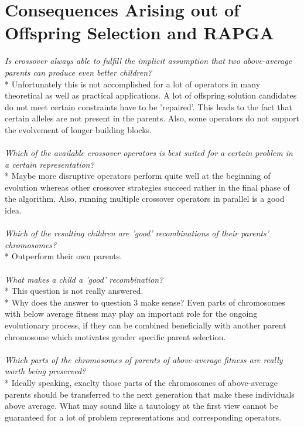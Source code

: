 \documentclass[12pt]{book}
\begin{document}
\section{Consequences Arising out of Offspring Selection and RAPGA}
\textit{Is crossover always able to fulfill the implicit assumption that two above-average parents can produce even better children?}\\*
Unfortunately this is not accomplished for a lot of operators in many theoretical as well as practical applications. A lot of offspring solution candidates do not meet certain constraints have to be 'repaired'. This leads to the fact that certain alleles are not present in the parents. Also, some operators do not support the evolvement of longer building blocks.\\\\
\textit{Which of the available crossover operators is best suited for a certain problem in a certain representation?}\\*
Maybe more disruptive operators perform quite well at the beginning of evolution whereas other crossover strategies succeed rather in the final phase of the algorithm. Also, running multiple crossover operators in parallel is a good idea.\\\\
\textit{Which of the resulting children are 'good' recombinations of their parents' chromosomes?}\\*
Outperform their own parents.\\\\
\textit{What makes a child a 'good' recombination?}\\*
This question is not really answered.\\*
Why does the answer to question 3 make sense? Even parts of chromosomes with below average fitness may play an important role for the ongoing evolutionary process, if they can be combined beneficially with another parent chromosome which motivates gender specific parent selection.\\\\
\textit{Which parts of the chromosomes of parents of above-average fitness are really worth being preserved?}\\*
Ideally speaking, exaclty those parts of the chromosomes of above-average parents should be transferred to the next generation that make these individuals above average. What may sound like a tautology at the first view cannot be guaranteed for a lot of problem representations and corresponding operators.
\end{document}
